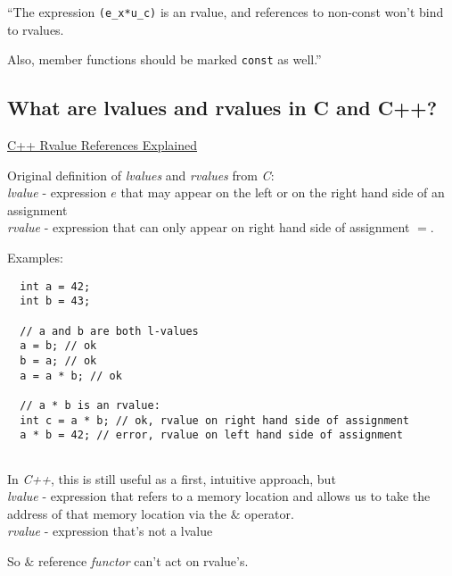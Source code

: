 \documentclass[10pt]{amsart}
\begin{document}
\begin{multicols*}{2}
``The expression \verb|(e_x*u_c)| is an rvalue, and references to non-const won't bind to rvalues.

Also, member functions should be marked \verb|const| as well.''  

\subsection{What are lvalues and rvalues in C and C++?}

\href{http://thbecker.net/articles/rvalue_references/section_01.html}{C++ Rvalue References Explained}

Original definition of \emph{lvalues} and \emph{rvalues} from \emph{C}: \\
\emph{lvalue} - expression $e$ that may appear on the left or on the right hand side of an assignment \\
\emph{rvalue} - expression that can only appear on right hand side of assignment $=$.

Examples:

\begin{lstlisting}
  int a = 42;
  int b = 43;

  // a and b are both l-values
  a = b; // ok
  b = a; // ok
  a = a * b; // ok

  // a * b is an rvalue:
  int c = a * b; // ok, rvalue on right hand side of assignment
  a * b = 42; // error, rvalue on left hand side of assignment
  
  \end{lstlisting}

In \emph{C++}, this is still useful as a first, intuitive approach, but \\
\emph{lvalue} - expression that refers to a memory location and allows us to take the address of that memory location via the $\&$ operator. \\
\emph{rvalue} - expression that's not a lvalue

So $\&$ reference \emph{functor} can't act on rvalue's.



\end{multicols*}
\end{document}
